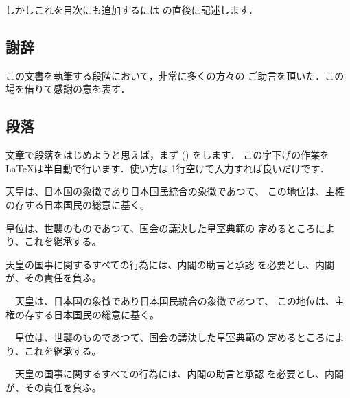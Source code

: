 しかしこれを目次にも追加するには  の直後に記述します．

\begin{intext}
\chapter*{謝辞}
この文書を執筆する段階において，非常に多くの方々の
ご助言を頂いた．この場を借りて感謝の意を表す．
\end{intext}













\section{段落}
文章で段落をはじめようと思えば，まず () 
をします．%
この字下げの作業を{\LaTeX}は半自動で行います．使い方は
1行空けて入力すれば良いだけです．

\begin{inonly}
天皇は、日本国の象徴であり日本国民統合の象徴であつて、
この地位は、主権の存する日本国民の総意に基く。 

皇位は、世襲のものであつて、国会の議決した皇室典範の
定めるところにより、これを継承する。 

天皇の国事に関するすべての行為には、内閣の助言と承認
を必要とし、内閣が、その責任を負ふ。 
\end{inonly}
\begin{outonly}
　天皇は、日本国の象徴であり日本国民統合の象徴であつて、
この地位は、主権の存する日本国民の総意に基く。 

　皇位は、世襲のものであつて、国会の議決した皇室典範の
定めるところにより、これを継承する。 

　天皇の国事に関するすべての行為には、内閣の助言と承認
を必要とし、内閣が、その責任を負ふ。  
\end{outonly}


